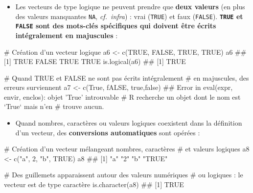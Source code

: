 \documentclass[12pt,twosided, notitlepage]{book}
\newenvironment{Shaded}{}{}
\newcommand{\KeywordTok}[1]{\textcolor[rgb]{0.00,0.00,1.00}{#1}}
\newcommand{\DecValTok}[1]{#1}
\newcommand{\StringTok}[1]{\textcolor[rgb]{0.00,0.50,0.50}{#1}}
\newcommand{\CommentTok}[1]{\textcolor[rgb]{0.00,0.50,0.00}{#1}}
\newcommand{\OtherTok}[1]{\textcolor[rgb]{1.00,0.25,0.00}{#1}}
\newcommand{\NormalTok}[1]{#1}
\providecommand{\tightlist}{%
  \setlength{\itemsep}{0pt}\setlength{\parskip}{0pt}}
\renewenvironment{Shaded}{\begin{snugshade}}{\end{snugshade}}
\begin{document}
\begin{itemize}
\tightlist
\item
  Les vecteurs de type logique ne peuvent prendre que \textbf{deux
  valeurs} (en plus des valeurs manquantes \texttt{NA},
  \emph{cf.~infra}) : vrai (\texttt{TRUE}) et faux (\texttt{FALSE}).
  \textbf{\texttt{TRUE} et \texttt{FALSE} sont des mots-clés spécifiques
  qui doivent être écrits intégralement en majuscules} :
\end{itemize}

\begin{Shaded}
\begin{Highlighting}[]
\CommentTok{# Création d'un vecteur logique}
\NormalTok{a6 <-}\StringTok{ }\KeywordTok{c}\NormalTok{(}\OtherTok{TRUE}\NormalTok{, }\OtherTok{FALSE}\NormalTok{, }\OtherTok{TRUE}\NormalTok{, }\OtherTok{TRUE}\NormalTok{)}
\NormalTok{a6}
\NormalTok{  ## [1]  TRUE FALSE  TRUE  TRUE}
\KeywordTok{is.logical}\NormalTok{(a6)}
\NormalTok{  ## [1] TRUE}

\CommentTok{# Quand TRUE et FALSE ne sont pas écrits intégralement }
\CommentTok{# en majuscules, des erreurs surviennent}
\NormalTok{a7 <-}\StringTok{ }\KeywordTok{c}\NormalTok{(True, fALSE, true,false)}
\NormalTok{  ## Error in eval(expr, envir, enclos): objet 'True' introuvable}
\CommentTok{# R recherche un objet dont le nom est `True` mais n'en }
\CommentTok{# trouve aucun.}
\end{Highlighting}
\end{Shaded}

\begin{itemize}
\tightlist
\item
  Quand nombres, caractères ou valeurs logiques coexistent dans la
  définition d'un vecteur, des \textbf{conversions automatiques} sont
  opérées :
\end{itemize}

\begin{Shaded}
\begin{Highlighting}[]
\CommentTok{# Création d'un vecteur mélangeant nombres, caractères}
\CommentTok{# et valeurs logiques}
\NormalTok{a8 <-}\StringTok{ }\KeywordTok{c}\NormalTok{(}\StringTok{"a"}\NormalTok{, }\DecValTok{2}\NormalTok{, }\StringTok{"b"}\NormalTok{, }\OtherTok{TRUE}\NormalTok{)}
\NormalTok{a8}
\NormalTok{  ## [1] "a"    "2"    "b"    "TRUE"}

\CommentTok{# Des guillemets apparaissent autour des valeurs numériques}
\CommentTok{# ou logiques : le vecteur est de type caractère}
\KeywordTok{is.character}\NormalTok{(a8)}
\NormalTok{  ## [1] TRUE}
\end{Highlighting}
\end{Shaded}
\end{document}
